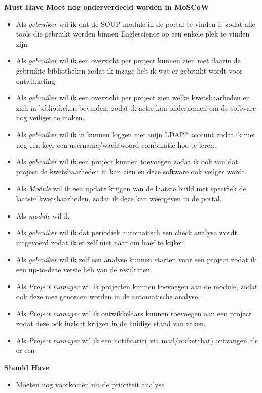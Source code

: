 \textbf{Must Have Moet nog onderverdeeld worden in MoSCoW}
\begin{itemize}
    \item Als \textit{gebruiker} wil ik dat de SOUP module in de portal te vinden is zodat alle tools die gebruikt worden binnen Eaglescience op een enkele plek te vinden zijn.
    \item Als \textit{gebruiker} wil ik een overzicht per project kunnen zien met daarin de gebruikte bibliotheken zodat ik inzage heb ik wat er gebruikt wordt voor ontwikkeling.
    \item Als \textit{gebruiker} wil ik een overzicht per project zien welke kwetsbaarheden er zich in bibliotheken bevinden, zodat ik actie kan ondernemen om de software nog veiliger te maken.
    \item Als \textit{gebruiker} wil ik in kunnen loggen met mijn LDAP? account zodat ik niet nog een keer een username/wachtwoord combinatie hoe te leren.
    \item Als \textit{gebruiker} wil ik een project kunnen toevoegen zodat ik ook van dat project de kwetsbaarheden in kan zien en deze software ook veilger wordt.
    \item Als \textit{Module} wil ik een update krijgen van de laatste build met specifiek de laatste kwetsbaarheden, zodat ik deze kan weergeven in de portal.
    \item Als \textit{module} wil ik
    \item Als \textit{gebruiker} wil ik dat periodiek automatisch een check analyse wordt uitgevoerd zodat ik er zelf niet naar om hoef te kijken.
    \item Als \textit{gebruiker} wil ik zelf een analyse kunnen starten voor een project zodat ik een up-to-date versie heb van de resultaten.
    \item Als \textit{Project manager} wil ik projecten kunnen toevoegen aan de module, zodat ook deze mee genomen worden in de automatische analyse.
    \item Als \textit{Project manager} wil ik ontwikkelaars kunnen toevoegen aan een project zodat deze ook inzicht krijgen in de huidige stand van zaken.
    \item Als \textit{Project manager} wil ik een notificatie( via mail/rocketchat) ontvangen als er een
\end{itemize}

\textbf{Should Have}
\begin{itemize}
    \item Moeten nog voorkomen uit de prioriteit analyse
\end{itemize}

